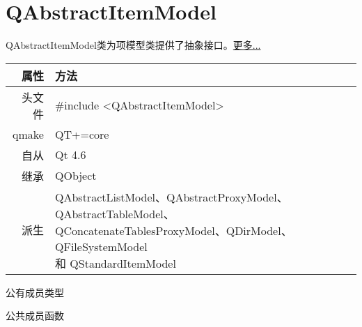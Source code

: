 \chapter{QAbstractItemModel}

QAbstractItemModel类为项模型类提供了抽象接口。\href{https://github.com/JackLovel/QtDocumentCN/blob/master/Src/A/QAbstractItemModel}{更多...} 

\begin{tabular}{|r|l|}
	\hline
	属性 & 方法 \\
	\hline
	头文件 & \#include <QAbstractItemModel>\\      
	\hline
	qmake & QT+=core\\      
	\hline
	自从 & Qt 4.6\\
	\hline
	继承&QObject \\
	\hline
	派生 & \makecell{QAbstractListModel、QAbstractProxyModel、
           QAbstractTableModel、\\QConcatenateTablesProxyModel、QDirModel、QFileSystemModel \\和 QStandardItemModel} \\
	\hline
\end{tabular}

\splitLine

公有成员类型



\splitLine

公共成员函数

